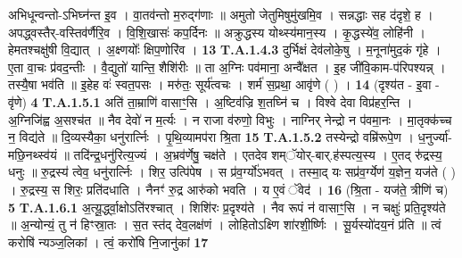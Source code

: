 \documentclass[17pt]{extarticle}
\begin{document}
                  अभिधून्वन्तो-ऽभिघ्न॑न्त इ॒व । वा॒तव॑न्तो म॒रुद्ग॑णाः ॥ अमुतो जेतुमिषुमु॑खमि॒व । सन्नद्धाः सह द॑दृशे॒ ह । अपद्ध्वस्तैर्-वस्तिव॑र्णैरि॒व । वि॒शि॒खासः॑ कप॒र्दिनः ॥ अक्रुद्धस्य योथ्स्य॑मान॒स्य । कृ॒द्धस्ये॑व॒ लोहि॑नी । हेमतश्चक्षु॑षी वि॒द्यात् । अ॒क्ष्णयोः᳚ क्षिप॒णोरि॑व । \textbf{ 13} \newline
                  \newline
                                                                  \textbf{ T.A.1.4.3} \newline
                  दुर्भिक्षं देव॑लोके॒षु । म॒नूना॑मुद॒कं गृ॑हे । ए॒ता वा॒चः प्र॑वद॒न्तीः । वै॒द्युतो॑ यान्ति॒ शैशि॑रीः ॥ ता अ॒ग्निः पव॑माना॒ अन्वै᳚क्षत । इ॒ह जी॑वि॒काम-प॑रिपश्यन्न् । तस्यै॒षा भव॑ति ॥ इ॒हेह वः॑ स्वत॒पसः । मरु॑तः॒ सूर्य॑त्वचः । शर्म॑ स॒प्रथा॒ आवृ॑णे ( ) । \textbf{ 14} \newline
                  \newline
                                                        (दृश्य॑त - इ॒वा - वृ॑णे) \textbf{4} \newline \newline
                                \textbf{ T.A.1.5.1} \newline
                  अति॑ ता॒म्राणि॑ वासाꣳ॒॒सि । अ॒ष्टिव॑ज्रि श॒तघ्नि॑ च ।  विश्वे देवा विप्र॑हर॒न्ति । अ॒ग्निजि॑ह्व अ॒सश्च॑त ॥ नैव देवो॑ न म॒र्त्यः । न राजा व॑रुणो॒ विभुः । नाग्निर् नेन्द्रो न प॑वमा॒नः । मा॒तृक्क॑च्च न॒ विद्य॑ते ॥ दि॒व्यस्यैका॒ धनु॑रार्त्निः ।  पृ॒थि॒व्यामप॑रा श्रि॒ता \textbf{ 15} \newline
                  \newline
                                                                  \textbf{ T.A.1.5.2} \newline
                  तस्येन्द्रो वम्रि॑रूपे॒ण । ध॒नुर्ज्या॑-मछि॒नथ्स्व॑यं ॥ तदि॑न्द्र॒धनु॑रित्य॒ज्यं । अ॒भ्रव॑र्णेषु॒ चक्ष॑ते । एतदेव शम्ॅयोर्-बार्.ह॑स्पत्य॒स्य । ए॒तद् रु॑द्रस्य॒ धनुः ॥ रु॒द्रस्य॑ त्वेव॒ धनु॑रार्त्निः । शिर॒ उत्पि॑पेष ।  स प्र॑व॒र्ग्यो॑ऽभवत् । तस्मा॒द् यः सप्र॑व॒र्ग्येण॑ य॒ज्ञेन॒ यज॑ते ( ) ।  रु॒द्रस्य॒ स शिरः॒ प्रति॑दधाति । नैनꣳ॑ रु॒द्र आरु॑को भवति । य ए॒वं ॅवेद॑ । \textbf{ 16} \newline
                  \newline
                                                        (श्रि॒ता - यज॑ते॒ त्रीणि॑ च) \textbf{5} \newline \newline
                                \textbf{ T.A.1.6.1} \newline
                  अ॒त्यू॒र्द्ध्वा॒क्षोऽति॑रश्चात् । शिशि॑रः प्र॒दृश्य॑ते ।  नैव रूपं न॑ वासाꣳ॒॒सि । न चक्षुः॑ प्रति॒दृश्य॑ते ॥ अ॒न्योन्यं॒ तु न॑ हिꣳस्रा॒तः । स॒त स्त॑द् देव॒लक्ष॑णं । लोहितोऽक्ष्णि शा॑रशी॒र्ष्णिः ।  सू॒र्यस्यो॑दय॒नं प्र॑ति ॥ त्वं करोषि॑ न्यञ्ज॒लिकां । त्वं॒ करो॑षि नि॒जानु॑कां \textbf{ 17} \newline
\end{document}
